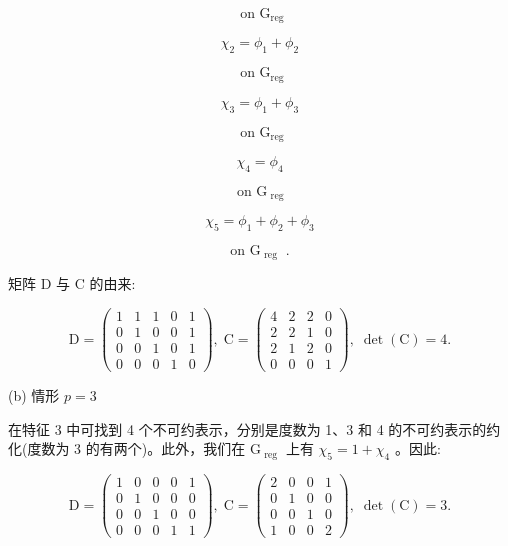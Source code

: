 \documentclass[10pt]{article}
\begin{document}
\[
\text{ on }{\mathrm{G}}_{\mathrm{{reg}}}
\]

\[
{\chi }_{2} = {\phi }_{1} + {\phi }_{2}
\]

\[
\text{ on }{\mathrm{G}}_{\mathrm{{reg}}}
\]

\[
{\chi }_{3} = {\phi }_{1} + {\phi }_{3}
\]

\[
\text{ on }{\mathrm{G}}_{\mathrm{{reg}}}
\]

\[
{\chi }_{4} = {\phi }_{4}
\]

\[
\text{ on }{\mathrm{G}}_{\text{ reg }}
\]

\[
{\chi }_{5} = {\phi }_{1} + {\phi }_{2} + {\phi }_{3}
\]

\[
\text{ on }{\mathrm{G}}_{\text{ reg }}\text{ . }
\]

矩阵 \(\mathrm{D}\) 与 \(\mathrm{C}\) 的由来:

\[
\mathrm{D} = \left( \begin{array}{lllll} 1 & 1 & 1 & 0 & 1 \\  0 & 1 & 0 & 0 & 1 \\  0 & 0 & 1 & 0 & 1 \\  0 & 0 & 0 & 1 & 0 \end{array}\right) ,\;\mathrm{C} = \left( \begin{array}{llll} 4 & 2 & 2 & 0 \\  2 & 2 & 1 & 0 \\  2 & 1 & 2 & 0 \\  0 & 0 & 0 & 1 \end{array}\right) ,\;\det \left( \mathrm{C}\right)  = 4.
\]

(b) 情形 \(p = 3\)

在特征 3 中可找到 4 个不可约表示，分别是度数为 1、3 和 4 的不可约表示的约化(度数为 3 的有两个)。此外，我们在 \({\mathrm{G}}_{\text{ reg }}\) 上有 \({\chi }_{5} = 1 + {\chi }_{4}\) 。因此:

\[
\mathrm{D} = \left( \begin{array}{lllll} 1 & 0 & 0 & 0 & 1 \\  0 & 1 & 0 & 0 & 0 \\  0 & 0 & 1 & 0 & 0 \\  0 & 0 & 0 & 1 & 1 \end{array}\right) ,\;\mathrm{C} = \left( \begin{array}{llll} 2 & 0 & 0 & 1 \\  0 & 1 & 0 & 0 \\  0 & 0 & 1 & 0 \\  1 & 0 & 0 & 2 \end{array}\right) ,\;\det \left( \mathrm{C}\right)  = 3.
\]
\end{document}
